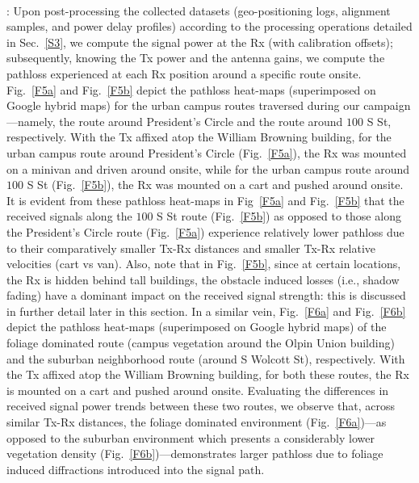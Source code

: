 \documentclass[10pt, twocolumn]{IEEEtran}
\begin{document}
{\\: Upon post-processing the collected datasets (geo-positioning logs, alignment samples, and power delay profiles) according to the processing operations detailed in Sec.~\ref{S3}, we compute the signal power at the Rx (with calibration offsets); subsequently, knowing the Tx power and the antenna gains, we compute the pathloss experienced at each Rx position around a specific route onsite. Fig.~\ref{F5a} and Fig.~\ref{F5b} depict the pathloss heat-maps (superimposed on Google hybrid maps) for the urban campus routes traversed during our campaign---namely, the route around President's Circle and the route around $100$ S St, respectively. With the Tx affixed atop the William Browning building, for the urban campus route around President's Circle (Fig.~\ref{F5a}), the Rx was mounted on a minivan and driven around onsite, while for the urban campus route around $100$ S St (Fig.~\ref{F5b}), the Rx was mounted on a cart and pushed around onsite. It is evident from these pathloss heat-maps in Fig~\ref{F5a} and Fig.~\ref{F5b} that the received signals along the $100$ S St route (Fig.~\ref{F5b}) as opposed to those along the President's Circle route (Fig.~\ref{F5a}) experience relatively lower pathloss due to their comparatively smaller Tx-Rx distances and smaller Tx-Rx relative velocities (cart vs van). Also, note that in Fig.~\ref{F5b}, since at certain locations, the Rx is hidden behind tall buildings, the obstacle induced losses (i.e., shadow fading) have a dominant impact on the received signal strength: this is discussed in further detail later in this section. In a similar vein, Fig.~\ref{F6a} and Fig.~\ref{F6b} depict the pathloss heat-maps (superimposed on Google hybrid maps) of the foliage dominated route (campus vegetation around the Olpin Union building) and the suburban neighborhood route (around S Wolcott St), respectively. With the Tx affixed atop the William Browning building, for both these routes, the Rx is mounted on a cart and pushed around onsite. Evaluating the differences in received signal power trends between these two routes, we observe that, across similar Tx-Rx distances, the foliage dominated environment (Fig.~\ref{F6a})---as opposed to the suburban environment which presents a considerably lower vegetation density (Fig.~\ref{F6b})---demonstrates larger pathloss due to foliage induced diffractions introduced into the signal path.\\
\begin{figure} [t]
    \centering
    \begin{subfigure}{0.564\linewidth}

\end{subfigure}
\end{figure}}
\end{document}
